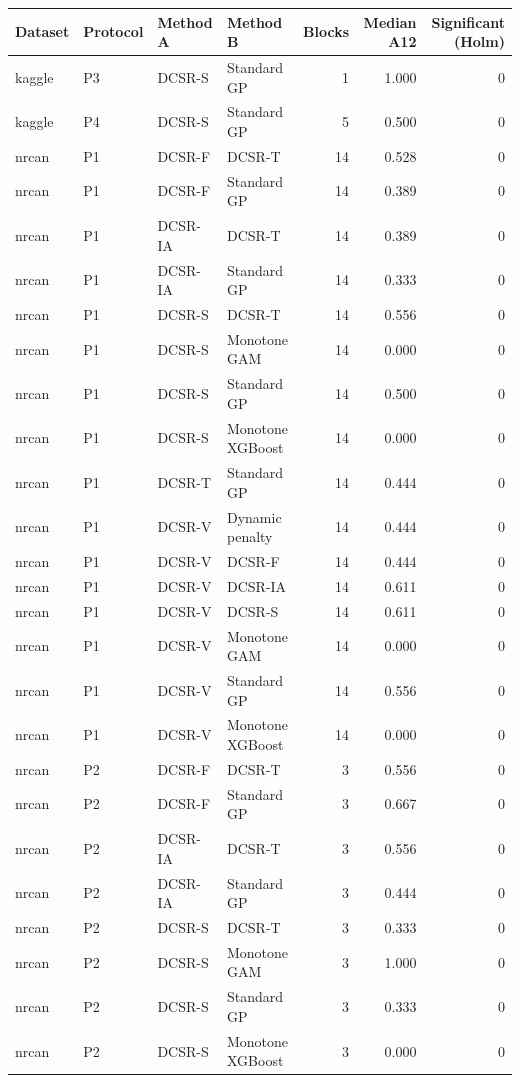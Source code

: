 \begin{tabular}{llllrrr}
\toprule
Dataset & Protocol & Method A & Method B & Blocks & Median A12 & Significant (Holm) \\
\midrule
kaggle & P3 & DCSR-S & Standard GP & 1 & 1.000 & 0 \\
kaggle & P4 & DCSR-S & Standard GP & 5 & 0.500 & 0 \\
nrcan & P1 & DCSR-F & DCSR-T & 14 & 0.528 & 0 \\
nrcan & P1 & DCSR-F & Standard GP & 14 & 0.389 & 0 \\
nrcan & P1 & DCSR-IA & DCSR-T & 14 & 0.389 & 0 \\
nrcan & P1 & DCSR-IA & Standard GP & 14 & 0.333 & 0 \\
nrcan & P1 & DCSR-S & DCSR-T & 14 & 0.556 & 0 \\
nrcan & P1 & DCSR-S & Monotone GAM & 14 & 0.000 & 0 \\
nrcan & P1 & DCSR-S & Standard GP & 14 & 0.500 & 0 \\
nrcan & P1 & DCSR-S & Monotone XGBoost & 14 & 0.000 & 0 \\
nrcan & P1 & DCSR-T & Standard GP & 14 & 0.444 & 0 \\
nrcan & P1 & DCSR-V & Dynamic penalty & 14 & 0.444 & 0 \\
nrcan & P1 & DCSR-V & DCSR-F & 14 & 0.444 & 0 \\
nrcan & P1 & DCSR-V & DCSR-IA & 14 & 0.611 & 0 \\
nrcan & P1 & DCSR-V & DCSR-S & 14 & 0.611 & 0 \\
nrcan & P1 & DCSR-V & Monotone GAM & 14 & 0.000 & 0 \\
nrcan & P1 & DCSR-V & Standard GP & 14 & 0.556 & 0 \\
nrcan & P1 & DCSR-V & Monotone XGBoost & 14 & 0.000 & 0 \\
nrcan & P2 & DCSR-F & DCSR-T & 3 & 0.556 & 0 \\
nrcan & P2 & DCSR-F & Standard GP & 3 & 0.667 & 0 \\
nrcan & P2 & DCSR-IA & DCSR-T & 3 & 0.556 & 0 \\
nrcan & P2 & DCSR-IA & Standard GP & 3 & 0.444 & 0 \\
nrcan & P2 & DCSR-S & DCSR-T & 3 & 0.333 & 0 \\
nrcan & P2 & DCSR-S & Monotone GAM & 3 & 1.000 & 0 \\
nrcan & P2 & DCSR-S & Standard GP & 3 & 0.333 & 0 \\
nrcan & P2 & DCSR-S & Monotone XGBoost & 3 & 0.000 & 0 \\

\end{tabular}
